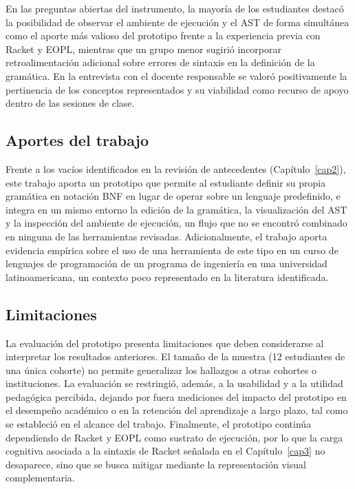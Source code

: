 En las preguntas abiertas del instrumento, la mayoría de los estudiantes destacó la posibilidad de observar el ambiente de ejecución y el AST de forma simultánea como el aporte más valioso del prototipo frente a la experiencia previa con Racket y EOPL, mientras que un grupo menor sugirió incorporar retroalimentación adicional sobre errores de sintaxis en la definición de la gramática. En la entrevista con el docente responsable se valoró positivamente la pertinencia de los conceptos representados y su viabilidad como recurso de apoyo dentro de las sesiones de clase.

\subsection{Aportes del trabajo}

Frente a los vacíos identificados en la revisión de antecedentes (Capítulo~\ref{cap2}), este trabajo aporta un prototipo que permite al estudiante definir su propia gramática en notación BNF en lugar de operar sobre un lenguaje predefinido, e integra en un mismo entorno la edición de la gramática, la visualización del AST y la inspección del ambiente de ejecución, un flujo que no se encontró combinado en ninguna de las herramientas revisadas. Adicionalmente, el trabajo aporta evidencia empírica sobre el uso de una herramienta de este tipo en un curso de lenguajes de programación de un programa de ingeniería en una universidad latinoamericana, un contexto poco representado en la literatura identificada.

\subsection{Limitaciones}

La evaluación del prototipo presenta limitaciones que deben considerarse al interpretar los resultados anteriores. El tamaño de la muestra (12 estudiantes de una única cohorte) no permite generalizar los hallazgos a otras cohortes o instituciones. La evaluación se restringió, además, a la usabilidad y a la utilidad pedagógica percibida, dejando por fuera mediciones del impacto del prototipo en el desempeño académico o en la retención del aprendizaje a largo plazo, tal como se estableció en el alcance del trabajo. Finalmente, el prototipo continúa dependiendo de Racket y EOPL como sustrato de ejecución, por lo que la carga cognitiva asociada a la sintaxis de Racket señalada en el Capítulo~\ref{cap3} no desaparece, sino que se busca mitigar mediante la representación visual complementaria.
